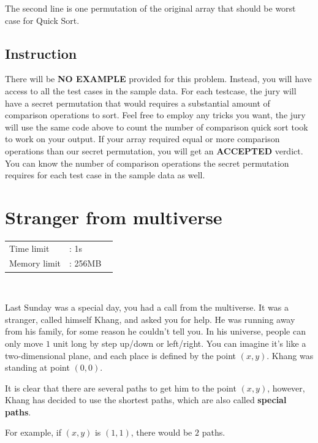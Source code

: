 \documentclass[12pt]{article}
\begin{document}
    The second line is one permutation of the original array that should be worst case for Quick Sort.
    
    \subsection*{Instruction}
    There will be \textbf{NO EXAMPLE} provided for this problem. Instead, you will have access to all the test cases in the sample data.
    For each testcase, the jury will have a secret permutation that would requires a substantial amount of comparison operations to sort.
    Feel free to employ any tricks you want, the jury will use the same code above to count the number of comparison quick sort took to work on your output. If your array required equal or more comparison operations than our secret permutation, you will get an \textbf{ACCEPTED} verdict.
    You can know the number of comparison operations the secret permutation requires for each test case in the sample data as well.
    \pagebreak
	
	
	\section{Stranger from multiverse}
	
	\vspace{-0.5cm}
	\begin{table}[!h]
		\hspace{1cm}
		\begin{tabular}{ll}
			Time limit   &: 1s        \\
			Memory limit &: 256MB         \
		\end{tabular}\\
	\end{table}
	
	Last Sunday was a special day, you had a call from the multiverse. It was a stranger, called himself Khang, and asked you for help. He was running away from his family, for some reason he couldn’t tell you. In his universe, people can only move $1$ unit long by step up/down or left/right. You can imagine it’s like a two-dimensional plane, and each place is defined by the point $(x,y)$. Khang was standing at point $(0,0)$.
	
	It is clear that there are several paths to get him to the point $(x,y)$, however, Khang has decided to use the shortest paths, which are also called \textbf{special paths}.
	
	For example, if $(x,y)$ is $(1,1)$, there would be $2$ paths.
	
\end{document}
